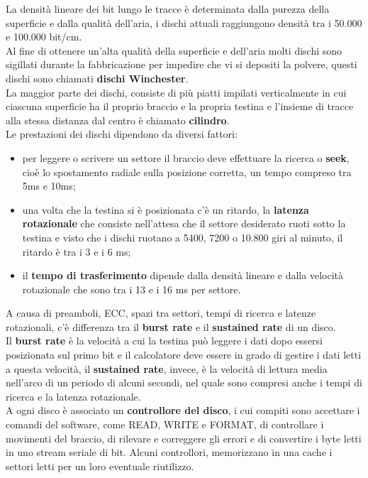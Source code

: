 \documentclass[12pt]{report}
\begin{document}
La densità lineare dei bit lungo le tracce è determinata dalla purezza della superficie e dalla qualità dell'aria, i dischi attuali raggiungono densità tra i 50.000 e 100.000 bit/cm. \\
Al fine di ottenere un'alta qualità della superficie e dell'aria molti dischi sono sigillati durante la fabbricazione per impedire che vi si depositi la polvere, questi dischi sono chiamati \textbf{dischi Winchester}. \\
La maggior parte dei dischi, consiste di più piatti impilati verticalmente in cui ciascuna superficie ha il proprio braccio e la propria testina e l'insieme di tracce alla stessa distanza dal centro è chiamato \textbf{cilindro}. \\
Le prestazioni dei dischi dipendono da diversi fattori:
\begin{itemize}
	\item per leggere o scrivere un settore il braccio deve effettuare la ricerca o \textbf{seek}, cioè lo spostamento radiale sulla posizione corretta, un tempo compreso tra 5ms e 10ms;
	\item una volta che la testina si è posizionata c'è un ritardo, la \textbf{latenza rotazionale} che consiste nell'attesa che il settore desiderato ruoti sotto la testina e visto che i dischi ruotano a 5400, 7200 o 10.800 giri al minuto, il ritardo è tra i 3 e i 6 ms;
	\item il \textbf{tempo di trasferimento} dipende dalla densità lineare e dalla velocità rotazionale che sono tra i 13 e i 16 ms per settore.
\end{itemize}
A causa di preamboli, ECC, spazi tra settori, tempi di ricerca e latenze rotazionali, c'è differenza tra il \textbf{burst rate} e il \textbf{sustained rate} di un disco. \\
Il \textbf{burst rate} è la velocità a cui la testina può leggere i dati dopo essersi posizionata sul primo bit e il calcolatore deve essere in grado di gestire i dati letti a questa velocità, il \textbf{sustained rate}, invece, è la velocità di lettura media nell'arco di un periodo di alcuni secondi, nel quale sono compresi anche i tempi di ricerca e la latenza rotazionale. \\
A ogni disco è associato un \textbf{controllore del disco}, i cui compiti sono accettare i comandi del software, come READ, WRITE e FORMAT, di controllare i movimenti del braccio, di rilevare e correggere gli errori e di convertire i byte letti in uno stream seriale di bit. Alcuni controllori, memorizzano in una cache i settori letti per un loro eventuale riutilizzo.
\end{document}

